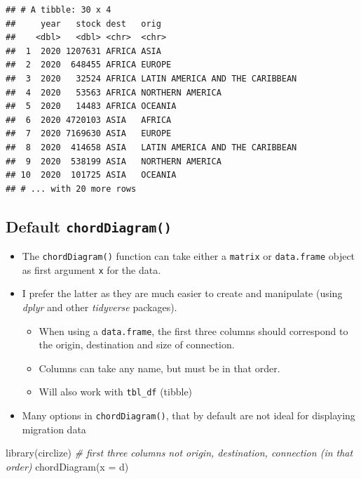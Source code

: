 \documentclass[
]{book}
\newenvironment{Shaded}{\begin{snugshade}}{\end{snugshade}}
\newcommand{\AttributeTok}[1]{\textcolor[rgb]{0.77,0.63,0.00}{#1}}
\newcommand{\CommentTok}[1]{\textcolor[rgb]{0.56,0.35,0.01}{\textit{#1}}}
\newcommand{\FunctionTok}[1]{\textcolor[rgb]{0.00,0.00,0.00}{#1}}
\newcommand{\NormalTok}[1]{#1}
\providecommand{\tightlist}{%
  \setlength{\itemsep}{0pt}\setlength{\parskip}{0pt}}
\begin{document}
\begin{verbatim}
## # A tibble: 30 x 4
##     year   stock dest   orig                           
##    <dbl>   <dbl> <chr>  <chr>                          
##  1  2020 1207631 AFRICA ASIA                           
##  2  2020  648455 AFRICA EUROPE                         
##  3  2020   32524 AFRICA LATIN AMERICA AND THE CARIBBEAN
##  4  2020   53563 AFRICA NORTHERN AMERICA               
##  5  2020   14483 AFRICA OCEANIA                        
##  6  2020 4720103 ASIA   AFRICA                         
##  7  2020 7169630 ASIA   EUROPE                         
##  8  2020  414658 ASIA   LATIN AMERICA AND THE CARIBBEAN
##  9  2020  538199 ASIA   NORTHERN AMERICA               
## 10  2020  101725 ASIA   OCEANIA                        
## # ... with 20 more rows
\end{verbatim}

\hypertarget{default-chorddiagram}{%
\subsection{\texorpdfstring{Default \texttt{chordDiagram()}}{Default chordDiagram()}}\label{default-chorddiagram}}

\begin{itemize}
\tightlist
\item
  The \texttt{chordDiagram()} function can take either a \texttt{matrix} or \texttt{data.frame} object as first argument \texttt{x} for the data.
\item
  I prefer the latter as they are much easier to create and manipulate (using \emph{dplyr} and other \emph{tidyverse} packages).

  \begin{itemize}
  \tightlist
  \item
    When using a \texttt{data.frame}, the first three columns should correspond to the origin, destination and size of connection.
  \item
    Columns can take any name, but must be in that order.
  \item
    Will also work with \texttt{tbl\_df} (tibble)
  \end{itemize}
\item
  Many options in \texttt{chordDiagram()}, that by default are not ideal for displaying migration data
\end{itemize}

\begin{Shaded}
\begin{Highlighting}[]
\FunctionTok{library}\NormalTok{(circlize)}
\CommentTok{\# first three columns not origin, destination, connection (in that order)}
\FunctionTok{chordDiagram}\NormalTok{(}\AttributeTok{x =}\NormalTok{ d)}
\end{Highlighting}
\end{Shaded}
\end{document}
